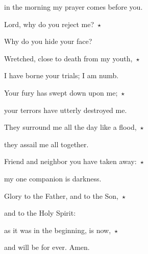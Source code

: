 in the morning my prayer comes before you.

\noindent Lord, why do you reject me?~$\star$~\nopagebreak

Why do you hide your face?

\noindent Wretched, close to death from my youth,~$\star$~\nopagebreak

I have borne your trials; I am numb.

\noindent Your fury has swept down upon me;~$\star$~\nopagebreak

your terrors have utterly destroyed me.

\noindent They surround me all the day like a flood,~$\star$~\nopagebreak

they assail me all together.

\noindent Friend and neighbor you have taken away:~$\star$~\nopagebreak

my one companion is darkness.

\noindent Glory to the Father, and to the Son,~$\star$~\nopagebreak

and to the Holy Spirit:

\noindent as it was in the beginning, is now,~$\star$~\nopagebreak

and will be for ever. Amen.
